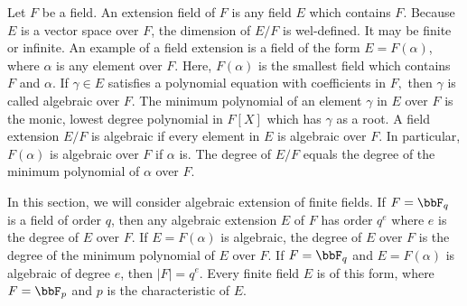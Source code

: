 Let $F$ be a field. An extension field of $F$ is any field $E$ which contains $F.$
Because $E$ is a vector space over $F$, the dimension of $E/F$ is wel-defined. 
It may be finite or infinite.
An example of a field extension is a field of the form $E = F(\alpha)$, 
where $\alpha$ is any element over $F.$
Here, $F(\alpha)$ is the smallest field which contains $F$ and $\alpha.$
If $\gamma \in E$ satisfies a polynomial equation with coefficients in $F,$ 
then $\gamma$ is called algebraic over $F$.
The minimum polynomial of an element $\gamma$ in $E$ over $F$ is the monic, lowest degree 
polynomial in $F[X]$ which has $\gamma$ as a root. 
A field extension $E/F$ is algebraic if every element in $E$ is algebraic over $F$. 
In particular, $F(\alpha)$ is algebraic over $F$ if $\alpha$ is. 
The degree of $E/F$ equals the degree of the minimum polynomial of $\alpha$ over $F$.

\bigskip


In this section, we will consider algebraic extension of finite fields. 
If $F = \bbF_q$ is a field of order $q$, then any algebraic extension $E$ 
of $F$ has order $q^e$ where $e$ is the degree of $E$ over $F$.
If $E = F(\alpha)$ is algebraic, the degree of $E$ over $F$ 
is the degree of the minimum polynomial of $E$ over $F$.
If $F = \bbF_q$ and $E = F(\alpha)$ is algebraic of degree $e$, then $|F| = q^e.$
Every finite field $E$ is of this form, where $F = \bbF_p$ and $p$ is the characteristic of $E$.

\bigskip

